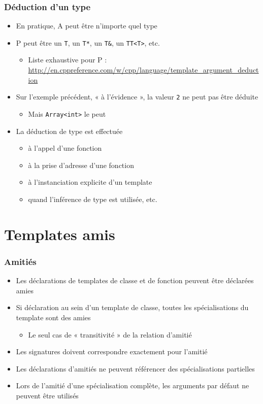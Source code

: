 \begin{frame}
\frametitle{Déduction d'un type}
\begin{itemize}[<+->]
\item En pratique, A peut être n'importe quel type \cpp
\item P peut être un \texttt{T}, un \texttt{T*}, un \texttt{T\&}, un \texttt{TT<T>}, etc.
	\begin{itemize}
	\item Liste exhaustive pour P : \url{http://en.cppreference.com/w/cpp/language/template_argument_deduction}
	\end{itemize}
\item Sur l'exemple précédent, « à l'évidence », la valeur \texttt{2} ne peut pas être déduite
	\begin{itemize}
	\item Mais \lstinline|Array<int>| le peut
	\end{itemize}
\item La déduction de type est effectuée
	\begin{itemize}
	\item à l'appel d'une fonction
	\item à la prise d'adresse d'une fonction
	\item à l'instanciation explicite d'un template
	\item quand l'inférence de type est utilisée, etc.
	\end{itemize}
\end{itemize}
\end{frame}

\section[Amis]{Templates amis}

\begin{frame}
\frametitle{Amitiés}
\begin{itemize}[<+->]
\item Les déclarations de templates de classe et de fonction peuvent être déclarées amies
\item Si déclaration au sein d'un template de classe, toutes les spécialisations du template sont des amies
	\begin{itemize}
	\item Le seul cas de « transitivité » de la relation d'amitié
	\end{itemize}
\item Les signatures doivent correspondre exactement pour l'amitié
\item Les déclarations d'amitiés ne peuvent référencer des spécialisations partielles
\item Lors de l'amitié d'une spécialisation complète, les arguments par défaut ne peuvent être utilisés
\end{itemize}
\end{frame}

